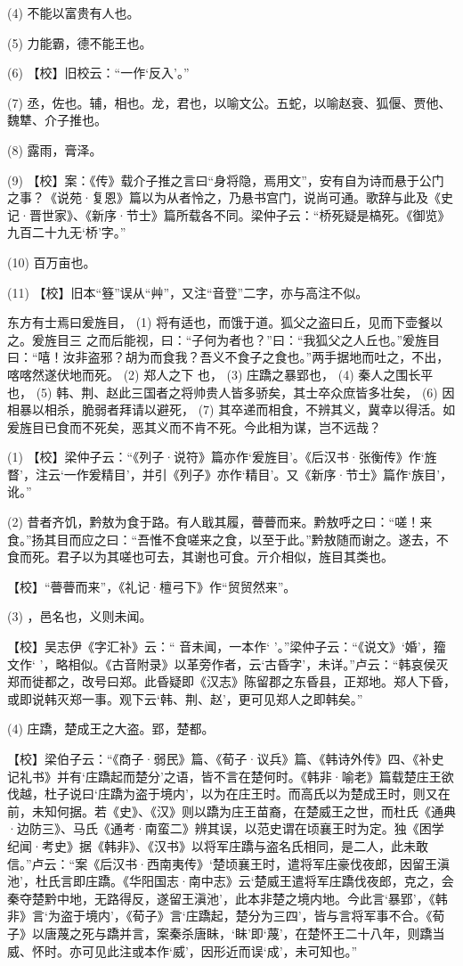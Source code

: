 \documentclass[12pt,UTF8]{ctexbook}
\begin{document}
(4) 不能以富贵有人也。

(5) 力能霸，德不能王也。

(6) 【校】旧校云：“一作‘反入’。”

(7) 丞，佐也。辅，相也。龙，君也，以喻文公。五蛇，以喻赵衰、狐偃、贾他、魏犨、介子推也。

(8) 露雨，膏泽。

(9) 【校】案：《传》载介子推之言曰“身将隐，焉用文”，安有自为诗而悬于公门之事？《说苑·复恩》篇以为从者怜之，乃悬书宫门，说尚可通。歌辞与此及《史记·晋世家》、《新序·节士》篇所载各不同。梁仲子云：“桥死疑是槁死。《御览》九百二十九无‘桥’字。”

(10) 百万亩也。

(11) 【校】旧本“簦”误从“艸”，又注“音登”二字，亦与高注不似。

东方有士焉曰爰旌目， (1) 将有适也，而饿于道。狐父之盗曰丘，见而下壶餐以 之。爰旌目三 之而后能视，曰：“子何为者也？”曰：“我狐父之人丘也。”爰旌目曰：“嘻！汝非盗邪？胡为而食我？吾义不食子之食也。”两手据地而吐之，不出，喀喀然遂伏地而死。 (2) 郑人之下 也， (3) 庄蹻之暴郢也， (4) 秦人之围长平也， (5) 韩、荆、赵此三国者之将帅贵人皆多骄矣，其士卒众庶皆多壮矣， (6) 因相暴以相杀，脆弱者拜请以避死， (7) 其卒递而相食，不辨其义，冀幸以得活。如爰旌目已食而不死矣，恶其义而不肯不死。今此相为谋，岂不远哉？

(1) 【校】梁仲子云：“《列子·说符》篇亦作‘爰旌目’。《后汉书·张衡传》作‘旌瞀’，注云‘一作爰精目’，并引《列子》亦作‘精目’。又《新序·节士》篇作‘族目’，讹。”

(2) 昔者齐饥，黔敖为食于路。有人戢其履，瞢瞢而来。黔敖呼之曰：“嗟！来食。”扬其目而应之曰：“吾惟不食嗟来之食，以至于此。”黔敖随而谢之。遂去，不食而死。君子以为其嗟也可去，其谢也可食。亓介相似，旌目其类也。

【校】“瞢瞢而来”，《礼记·檀弓下》作“贸贸然来”。

(3) ，邑名也，义则未闻。

【校】吴志伊《字汇补》云：“ 音未闻，一本作‘ ’。”梁仲子云：“《说文》‘婚’，籀文作‘ ’，略相似。《古音附录》以革旁作者，云‘古昏字’，未详。”卢云：“韩哀侯灭郑而徙都之，改号曰郑。此昏疑即《汉志》陈留郡之东昏县，正郑地。郑人下昏，或即说韩灭郑一事。观下云‘韩、荆、赵’，更可见郑人之即韩矣。”

(4) 庄蹻，楚成王之大盗。郢，楚都。

【校】梁伯子云：“《商子·弱民》篇、《荀子·议兵》篇、《韩诗外传》四、《补史记礼书》并有‘庄蹻起而楚分’之语，皆不言在楚何时。《韩非·喻老》篇载楚庄王欲伐越，杜子说曰‘庄蹻为盗于境内’，以为在庄王时。而高氏以为楚成王时，则又在前，未知何据。若《史》、《汉》则以蹻为庄王苗裔，在楚威王之世，而杜氏《通典·边防三》、马氏《通考·南蛮二》辨其误，以范史谓在顷襄王时为定。独《困学纪闻·考史》据《韩非》、《汉书》以将军庄蹻与盗名氏相同，是二人，此未敢信。”卢云：“案《后汉书·西南夷传》‘楚顷襄王时，遣将军庄豪伐夜郎，因留王滇池’，杜氏言即庄蹻。《华阳国志·南中志》云‘楚威王遣将军庄蹻伐夜郎，克之，会秦夺楚黔中地，无路得反，遂留王滇池’，此本非楚之境内地。今此言‘暴郢’，《韩非》言‘为盗于境内’，《荀子》言‘庄蹻起，楚分为三四’，皆与言将军事不合。《荀子》以唐蔑之死与蹻并言，案秦杀唐眛，‘眛’即‘蔑’，在楚怀王二十八年，则蹻当威、怀时。亦可见此注或本作‘威’，因形近而误‘成’，未可知也。”
\end{document}
